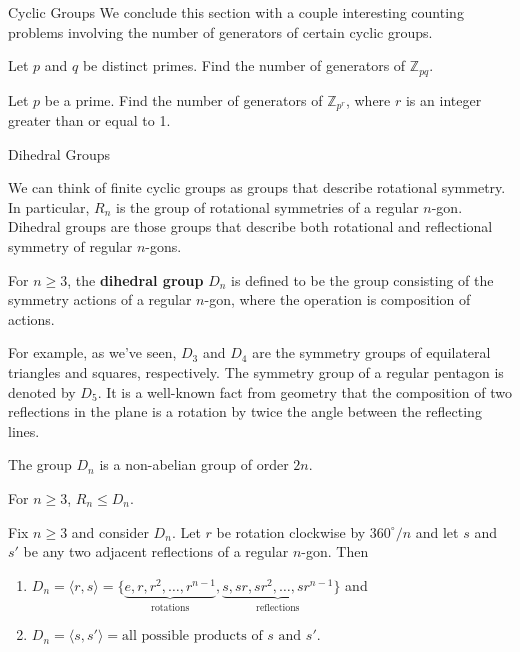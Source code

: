 \begin{section}{Cyclic Groups}
We conclude this section with a couple interesting counting problems involving the number of generators of certain cyclic groups.

\begin{problem}
Let $p$ and $q$ be distinct primes. Find the number of generators of $\mathbb{Z}_{pq}$.
\end{problem}

\begin{problem}
Let $p$ be a prime. Find the number of generators of $\mathbb{Z}_{p^r}$, where $r$ is an integer greater than or equal to 1.
\end{problem}



\end{section}

\begin{section}{Dihedral Groups}

We can think of finite cyclic groups as groups that describe rotational symmetry.  In particular, $R_n$ is the group of rotational symmetries of a regular $n$-gon.  Dihedral groups are those groups that describe both rotational and reflectional symmetry of regular $n$-gons.

\begin{definition}\label{def:dihedral}
For $n\geq 3$, the \textbf{dihedral group} $D_n$ is defined to be the group consisting of the symmetry actions of a regular $n$-gon, where the operation is composition of actions.
\end{definition}

For example, as we've seen, $D_3$ and $D_4$ are the symmetry groups of equilateral triangles and squares, respectively.  The symmetry group of a regular pentagon is denoted by $D_5$.  It is a well-known fact from geometry that the composition of two reflections in the plane is a rotation by twice the angle between the reflecting lines.

\begin{theorem}
The group $D_n$ is a non-abelian group of order $2n$.
\end{theorem}

\begin{theorem}
For $n\geq 3$, $R_n\leq D_n$.
\end{theorem}

\begin{theorem}\label{thm:generators_Dn}
Fix $n\geq 3$ and consider $D_n$. Let $r$ be rotation clockwise by $360^{\circ}/n$  and let $s$ and $s'$ be any two adjacent reflections of a regular $n$-gon.  Then
\begin{enumerate}[label=\rm{(\alph*)}]
\item $D_n=\langle r,s\rangle =\{\underbrace{e,r,r^2,\ldots, r^{n-1}}_{\text{rotations}},\underbrace{s,sr,sr^2,\ldots,sr^{n-1}}_{\text{reflections}}\}$ and
\item $D_n=\langle s,s'\rangle = \text{all possible products of }s\text{ and }s'$.
\end{enumerate}
\end{theorem}


\end{section}
